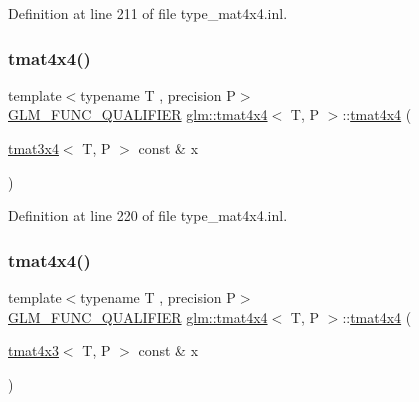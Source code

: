 Definition at line 211 of file type\+\_\+mat4x4.\+inl.

\mbox{\label{structglm_1_1tmat4x4_ad15d9ef57895ed333b7f6d857ac14306}} 
\subsubsection{\texorpdfstring{tmat4x4()}{tmat4x4()}\hspace{0.1cm}{\footnotesize\ttfamily [17/22]}}
{\footnotesize\ttfamily template$<$typename T , precision P$>$ \\
\mbox{\hyperlink{setup_8hpp_a33fdea6f91c5f834105f7415e2a64407}{G\+L\+M\+\_\+\+F\+U\+N\+C\+\_\+\+Q\+U\+A\+L\+I\+F\+I\+ER}} \mbox{\hyperlink{structglm_1_1tmat4x4}{glm\+::tmat4x4}}$<$ T, P $>$\+::\mbox{\hyperlink{structglm_1_1tmat4x4}{tmat4x4}} (\begin{DoxyParamCaption}\item[{\mbox{\hyperlink{structglm_1_1tmat3x4}{tmat3x4}}$<$ T, P $>$ const \&}]{x }\end{DoxyParamCaption})}



Definition at line 220 of file type\+\_\+mat4x4.\+inl.

\mbox{\label{structglm_1_1tmat4x4_a1826c29cae061983cde9d9dc860bc637}} 
\subsubsection{\texorpdfstring{tmat4x4()}{tmat4x4()}\hspace{0.1cm}{\footnotesize\ttfamily [18/22]}}
{\footnotesize\ttfamily template$<$typename T , precision P$>$ \\
\mbox{\hyperlink{setup_8hpp_a33fdea6f91c5f834105f7415e2a64407}{G\+L\+M\+\_\+\+F\+U\+N\+C\+\_\+\+Q\+U\+A\+L\+I\+F\+I\+ER}} \mbox{\hyperlink{structglm_1_1tmat4x4}{glm\+::tmat4x4}}$<$ T, P $>$\+::\mbox{\hyperlink{structglm_1_1tmat4x4}{tmat4x4}} (\begin{DoxyParamCaption}\item[{\mbox{\hyperlink{structglm_1_1tmat4x3}{tmat4x3}}$<$ T, P $>$ const \&}]{x }\end{DoxyParamCaption})}



